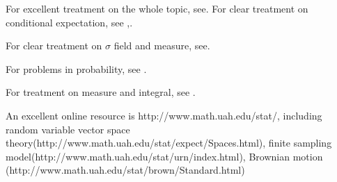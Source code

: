 \begin{refsection}
For excellent treatment on the whole topic, see\cite{shiryaev1996probability}\cite{feller2008introduction}.
For clear treatment on conditional expectation, see \cite{brzezniak1999basic},\cite{mikosch1998elementary}.

For clear treatment on $\sigma$ field and measure, see\cite{dineen2013probability}\cite{koralov2007theory}.

For problems in probability, see \cite{capinski2013probability}\cite{grimmett2001one}.

For treatment on measure and integral, see \cite{capinski2013measure}.



An excellent online resource is http://www.math.uah.edu/stat/, including random variable vector space theory(http://www.math.uah.edu/stat/expect/Spaces.html), finite sampling model(http://www.math.uah.edu/stat/urn/index.html), Brownian motion (http://www.math.uah.edu/stat/brown/Standard.html)

\printbibliography
\end{refsection}

